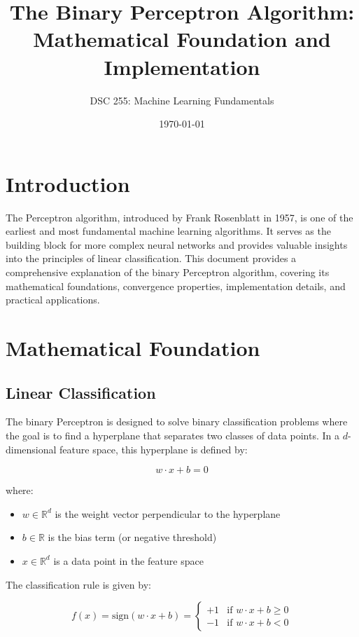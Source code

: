 \documentclass{article}
\title{The Binary Perceptron Algorithm: Mathematical Foundation and Implementation}
\author{DSC 255: Machine Learning Fundamentals}
\date{\today}
\begin{document}
\maketitle

\section{Introduction}

The Perceptron algorithm, introduced by Frank Rosenblatt in 1957, is one of the earliest and most fundamental machine learning algorithms. It serves as the building block for more complex neural networks and provides valuable insights into the principles of linear classification. This document provides a comprehensive explanation of the binary Perceptron algorithm, covering its mathematical foundations, convergence properties, implementation details, and practical applications.

\section{Mathematical Foundation}

\subsection{Linear Classification}

The binary Perceptron is designed to solve binary classification problems where the goal is to find a hyperplane that separates two classes of data points. In a $d$-dimensional feature space, this hyperplane is defined by:

\begin{equation}
w \cdot x + b = 0
\end{equation}

where:
\begin{itemize}
    \item $w \in \mathbb{R}^d$ is the weight vector perpendicular to the hyperplane
    \item $b \in \mathbb{R}$ is the bias term (or negative threshold)
    \item $x \in \mathbb{R}^d$ is a data point in the feature space
\end{itemize}

The classification rule is given by:

\begin{equation}
f(x) = \text{sign}(w \cdot x + b) = 
\begin{cases}
+1 & \text{if } w \cdot x + b \geq 0 \\
-1 & \text{if } w \cdot x + b < 0
\end{cases}
\end{equation}
\end{document}
